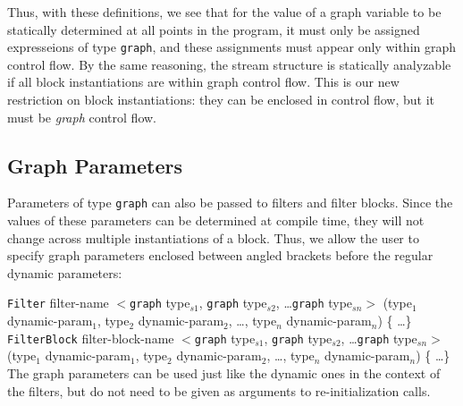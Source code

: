 \documentclass[draft]{article}
\begin{document}
Thus, with these definitions, we see that for the value of a graph
variable to be statically determined at all points in the program, it
must only be assigned expresseions of type {\tt graph}, and these
assignments must appear only within graph control flow.  By the same
reasoning, the stream structure is statically analyzable if all block
instantiations are within graph control flow.  This is our new
restriction on block instantiations: they can be enclosed in control
flow, but it must be {\it graph} control flow.

\subsection{Graph Parameters}

Parameters of type {\tt graph} can also be passed to filters and
filter blocks.  Since the values of these parameters can be determined
at compile time, they will not change across multiple instantiations
of a block.  Thus, we allow the user to specify graph parameters
enclosed between angled brackets before the regular dynamic
parameters:

{\tt Filter} filter-name $<${\tt graph} type$_{s1}$, {\tt graph} type$_{s2}$, \dots {\tt graph} type$_{sn}>$ (type$_1$ dynamic-param$_1$, type$_2$ dynamic-param$_2$, \dots , type$_n$ dynamic-param$_n$) \{ \dots \} \\

{\tt FilterBlock} filter-block-name $<${\tt graph} type$_{s1}$, {\tt graph} type$_{s2}$, \dots {\tt graph} type$_{sn}>$ (type$_1$ dynamic-param$_1$, type$_2$ dynamic-param$_2$, \dots , type$_n$ dynamic-param$_n$) \{ \dots \} \\

The graph parameters can be used just like the dynamic ones in the
context of the filters, but do not need to be given as arguments to
re-initialization calls.
\end{document}
